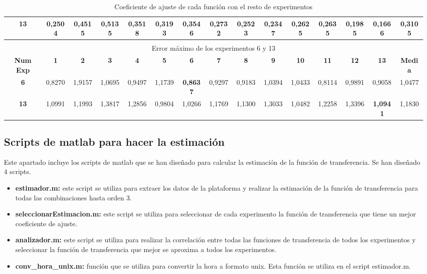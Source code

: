 \begin{table}[p]
\begin{sideways}
{\begin{tabular}{| c | c | c | c | c | c | c | c | c | c | c | c | c | c | c |}
		\hline
			\textbf{13} & 0,2504    & 0,4515   &  0,5135   &  0,3518    & 0,3193  &  0,3546   & 0,2732    & 0,2523   &  0,2347   & 0,2625  & 0,2635  &  0,1985  &\textbf{0,1666} & 0,3105 \\
		\hline
			\multicolumn{15}{|c|}{} \\
		\hline 
			\multicolumn{15}{|c|}{Error máximo de los experimentos 6 y 13} \\
		\hline
		\textbf{Num Exp} & \textbf{1} & \textbf{2} & \textbf{3} & \textbf{4} & \textbf{5} &\textbf{6} & \textbf{7} & \textbf{8} & \textbf{9} & \textbf{10} & \textbf{11} & \textbf{12} & \textbf{13} & \textbf{Media}\\
		\hline 
			\textbf{6}  & 0,8270    & 1,9157    & 1,0695    & 0,9497    & 1,1739  & \textbf{0,8637}    & 0,9297    & 0,9183    & 1,0394    &1,0433   & 0,8114    & 0,9891    & 0,9058    & 1,0477 \\
		\hline
			\textbf{13} & 1,0991    & 1,1993    & 1,3817    & 1,2856    & 0,9804   & 1,0266   & 1,1769    & 1,1300    & 1,3033    & 1,0482   & 1,2258    & 1,3396    & \textbf{1,0941}    & 1,1830  \\
		\hline
\end{tabular}}
\end{sideways}
\caption{Coeficiente de ajuste de cada función con el resto de experimentos}
 \end{table}

\newpage	
\subsection{ Scripts de matlab para hacer la estimación}

	Este apartado incluye los scripts de matlab que se han diseñado para calcular la estimación de la función de transferencia. Se han diseñado 4 scripts.

\begin{itemize}
	\item\textbf{estimador.m:} este script se utiliza para extraer los datos de la plataforma y realizar la estimación de la función de transferencia para todas las combinaciones hasta orden 3.
	\item\textbf{seleccionarEstimacion.m:} este script se utiliza para seleccionar de cada experimento la función de transferencia que tiene un mejor coeficiente de ajuste.
	\item\textbf{analizador.m:} este script se utiliza para realizar la correlación entre todas las funciones de transferencia de todos los experimentos y seleccionar la función de transferencia que mejor se aproxima a todos los experimentos.
	\item\textbf{conv\_hora\_unix.m:} función que se utiliza para convertir la hora a formato unix. Esta función se utiliza en el script estimador.m.
\end{itemize}

